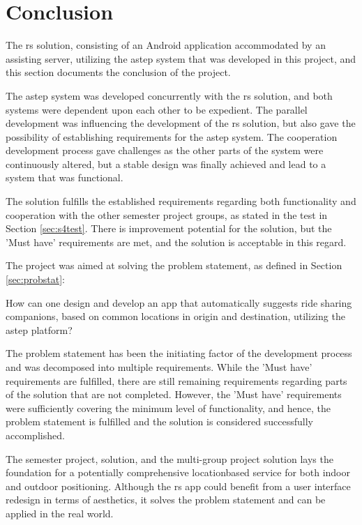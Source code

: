 \section{Conclusion}
The \gls{rs} solution, consisting of an Android application accommodated by an assisting server, utilizing the \gls{astep} system that was developed in this project, and this section documents the conclusion of the project.


The \gls{astep} system was developed concurrently with the \gls{rs} solution, and both systems were dependent upon each other to be expedient.
The parallel development was influencing the development of the \gls{rs} solution, but also gave the possibility of establishing requirements for the \gls{astep} system.
The cooperation development process gave challenges as the other parts of the system were continuously altered, but a stable design was finally achieved and lead to a system that was functional.


The solution fulfills the established requirements regarding both functionality and cooperation with the other semester project groups, as stated in the test in Section \ref{sec:s4test}.
There is improvement potential for the solution, but the 'Must have' requirements are met, and the solution is acceptable in this regard.


The project was aimed at solving the problem statement, as defined in Section \ref{sec:probstat}:

{\addtolength{\leftskip}{10mm}\addtolength{\rightskip}{10mm}\noindent\hrulefill\it
	
	\noindent How can one design and develop an app that automatically suggests ride sharing companions, based on common locations in origin and destination, utilizing the \gls{astep} platform? 
	
	\noindent\hrulefill
	
}

The problem statement has been the initiating factor of the development process and was decomposed into multiple requirements.
While the 'Must have' requirements are fulfilled, there are still remaining requirements regarding parts of the solution that are not completed.
However, the 'Must have' requirements were sufficiently covering the minimum level of functionality, and hence, the problem statement is fulfilled and the solution is considered successfully accomplished.

The semester project, solution, and the multi-group project solution lays the foundation for a potentially comprehensive locationbased service for both indoor and outdoor positioning.
Although the \gls{rs} app could benefit from a user interface redesign in terms of aesthetics, it solves the problem statement and can be applied in the real world.